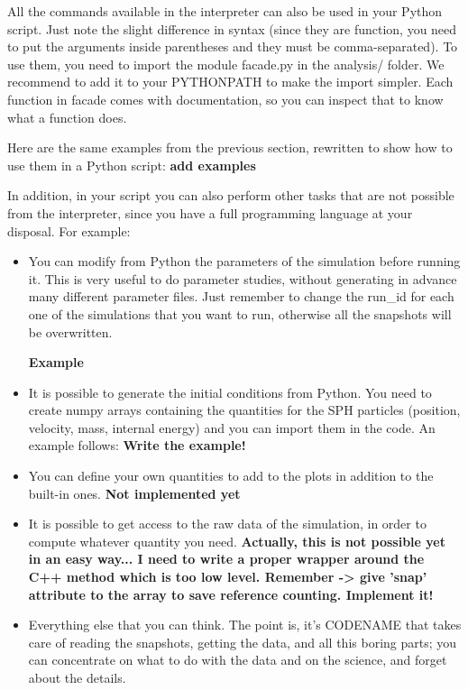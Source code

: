 \documentclass[a4paper]{article}
\begin{document}
All the commands available in the interpreter can also be used in your Python script. Just note the slight difference in syntax (since they are function, you need to put the arguments inside parentheses and they must be comma-separated). To use them, you need to import the module facade.py in the analysis/ folder. We recommend to add it to your PYTHONPATH to make the import simpler. Each function in facade comes with documentation, so you can inspect that to know what a function does.

Here are the same examples from the previous section, rewritten to show how to use them in a Python script:
\textbf{add examples}

In addition, in your script you can also perform other tasks that are not possible from the interpreter, since you have a full programming language at your disposal. For example:
\begin{itemize}

\item You can modify from Python the parameters of the simulation before running it. This is very useful to do parameter studies, without generating in advance many different parameter files. Just remember to change the run\_id for each one of the simulations that you want to run, otherwise all the snapshots will be overwritten.

\textbf{Example}

\item It is possible to generate the initial conditions from Python. You need to create numpy arrays containing the quantities for the SPH particles (position, velocity, mass, internal energy) and you can import them in the code. An example follows:
\textbf{Write the example!}

\item You can define your own quantities to add to the plots in addition to the built-in ones. \textbf{Not implemented yet}

\item It is possible to get access to the raw data of the simulation, in order to compute whatever quantity you need. \textbf{Actually, this is not possible yet in an easy way... I need to write a proper wrapper around the C++ method which is too low level. Remember -> give 'snap' attribute to the array to save reference counting. Implement it!}

\item Everything else that you can think. The point is, it's CODENAME that takes care of reading the snapshots, getting the data, and all this boring parts; you can concentrate on what to do with the data and on the science, and forget about the details.

\end{itemize}
\end{document}
